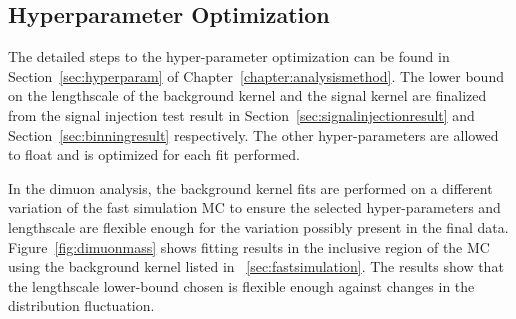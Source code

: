 \subsection{Hyperparameter Optimization}
The detailed steps to the hyper-parameter optimization can be found in Section~\ref{sec:hyperparam} of Chapter~\ref{chapter:analysismethod}.
The lower bound on the lengthscale of the background kernel and the signal kernel are finalized from the signal injection test result in Section~\ref{sec:signalinjectionresult} and Section~\ref{sec:binningresult} respectively. The other hyper-parameters are allowed to float and is optimized for each fit performed. 

In the dimuon analysis, the background kernel fits are performed on a different variation of the fast simulation MC to ensure the selected hyper-parameters and lengthscale are flexible enough for the variation possibly present in the final data. Figure~\ref{fig:dimuonmass} shows fitting results in the inclusive region of the MC using the background kernel listed in ~\ref{sec:fastsimulation}. The results show that the lengthscale lower-bound chosen is flexible enough against changes in the distribution fluctuation. 


